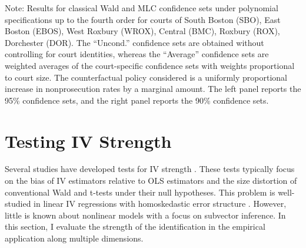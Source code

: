 \documentclass[11pt]{article}
\theoremstyle{definition}
\newcommand{\0}{\ensuremath{\mathbf{0}}}
\begin{document}
\begin{bibunit}
\begin{table}[htbp]
    \begin{tablenotes}
    \footnotesize \raggedright
      Note: {Results for classical Wald and MLC confidence sets under polynomial specifications up to the fourth order for courts of South Boston (SBO), East Boston (EBOS), West Roxbury (WROX), Central (BMC), Roxbury (ROX), Dorchester (DOR). The ``Uncond.'' confidence sets are obtained without controlling for court identities, whereas the ``Average'' confidence sets are weighted averages of the court-specific confidence sets with weights proportional to court size. The counterfactual policy considered is a uniformly proportional increase in nonprosecution rates by a marginal amount. The left panel reports the 95\% confidence sets, and the right panel reports the 90\% confidence sets.}
    \end{tablenotes}
    
\end{table}%
%
%
%
%
%
%


%
%
%
%
%
%
%


%
%
%
%
%
%
%


%

%
%
%
%
%
%
%
%
%
%
%


%
%
%
%
%
%
%

%
%
%
%
%
%

%
%
%
%
%
%
%

%
%
%
%
%
%
%


%


%
%

%
%
%
%
%
%
%
%
%
%
%
%
%
%
%
%
%
%
%
%
%
%
%
%
%
%
%
%


\newpage

%
\section{Testing IV Strength}
\label{appendix:iv_strength}


Several studies have developed tests for IV strength \citep{stock/yogo:2005, montielolea/pflueger:2013, lewis/mertens:2022}. These tests typically focus on the bias of IV estimators relative to OLS estimators and the size distortion of conventional Wald and t-tests under their null hypotheses. This problem is well-studied in linear IV regressions with homoskedastic error structure \citep[Section 4]{andrews/stock/sun:2019}. However, little is known about nonlinear models with a focus on subvector inference. In this section, I evaluate the strength of the identification in the empirical application along multiple dimensions. 



\end{bibunit}
\end{document}
